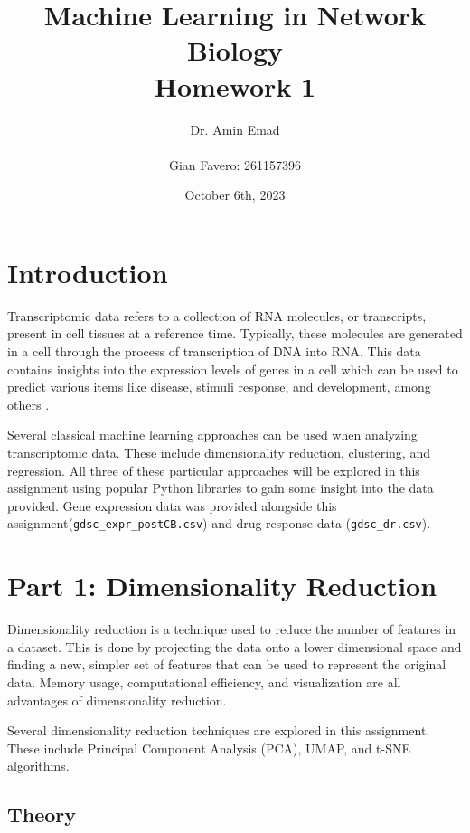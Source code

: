 \documentclass[11pt]{article}
\begin{document}
\title{Machine Learning in Network Biology\\Homework 1}
\author{
    Dr. Amin Emad \\ \\
    Gian Favero: 261157396 \\
}
\date{October 6th, 2023}
\maketitle
\newpage

\tableofcontents
\newpage

\section{Introduction}
Transcriptomic data refers to a collection of RNA molecules, or transcripts, present in cell tissues at a reference time. Typically, these molecules are generated in a cell through the process of transcription of DNA into RNA. This data contains insights into the expression levels of genes in a cell which can be used to predict various items like disease, stimuli response, and development, among others \cite{noauthor_transcriptome_nodate}.

Several classical machine learning approaches can be used when analyzing transcriptomic data. These include dimensionality reduction, clustering, and regression. All three of these particular approaches will be explored in this assignment using popular Python libraries to gain some insight into the data provided. Gene expression data was provided alongside this assignment(\verb|gdsc_expr_postCB.csv|) and drug response data (\verb|gdsc_dr.csv|).

\section{Part 1: Dimensionality Reduction}
Dimensionality reduction is a technique used to reduce the number of features in a dataset. This is done by projecting the data onto a lower dimensional space and finding a new, simpler set of features that can be used to represent the original data. Memory usage, computational efficiency, and visualization are all advantages of dimensionality reduction.

Several dimensionality reduction techniques are explored in this assignment. These include Principal Component Analysis (PCA), UMAP, and t-SNE algorithms.

\subsection{Theory}
\end{document}
